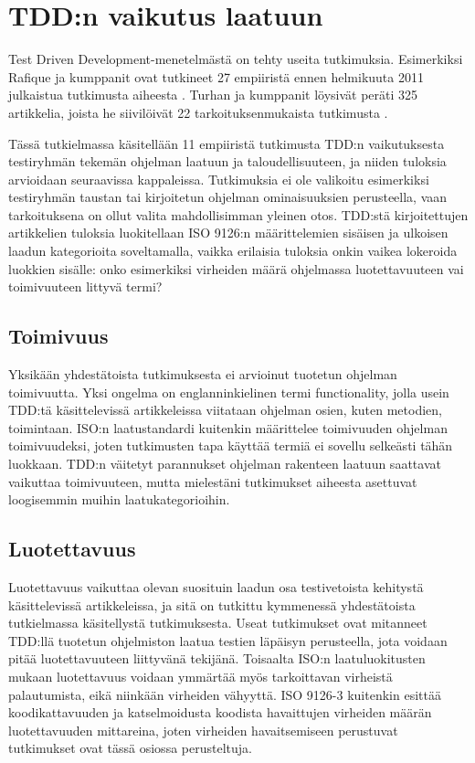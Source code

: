 \documentclass[finnish]{tktltiki2}
\theoremstyle{definition}
\theoremstyle{remark}
\begin{document}
\section{TDD:n vaikutus laatuun}

Test Driven Development-menetelmästä on tehty useita tutkimuksia. Esimerkiksi Rafique ja kumppanit ovat tutkineet 27 empiiristä ennen helmikuuta 2011 julkaistua tutkimusta aiheesta \cite{Rafique13}. Turhan ja kumppanit löysivät peräti 325 artikkelia, joista he siivilöivät 22 tarkoituksenmukaista tutkimusta \cite{Turhan10}.

Tässä tutkielmassa käsitellään 11 empiiristä tutkimusta TDD:n vaikutuksesta testiryhmän tekemän ohjelman laatuun ja taloudellisuuteen, ja niiden tuloksia arvioidaan seuraavissa kappaleissa. Tutkimuksia ei ole valikoitu esimerkiksi testiryhmän taustan tai kirjoitetun ohjelman ominaisuuksien perusteella, vaan tarkoituksena on ollut valita mahdollisimman yleinen otos. TDD:stä kirjoitettujen artikkelien tuloksia luokitellaan ISO 9126:n määrittelemien sisäisen ja ulkoisen laadun kategorioita soveltamalla, vaikka erilaisia tuloksia onkin vaikea lokeroida luokkien sisälle: onko esimerkiksi virheiden määrä ohjelmassa luotettavuuteen vai toimivuuteen littyvä termi? 





\subsection{Toimivuus}

Yksikään yhdestätoista tutkimuksesta ei arvioinut tuotetun ohjelman toimivuutta. Yksi ongelma on englanninkielinen termi functionality, jolla usein TDD:tä käsittelevissä artikkeleissa viitataan ohjelman osien, kuten metodien, toimintaan. ISO:n laatustandardi kuitenkin määrittelee toimivuuden ohjelman toimivuudeksi, joten tutkimusten tapa käyttää termiä ei sovellu selkeästi tähän luokkaan. TDD:n väitetyt parannukset ohjelman rakenteen laatuun saattavat vaikuttaa toimivuuteen, mutta mielestäni tutkimukset aiheesta asettuvat loogisemmin muihin laatukategorioihin.

\subsection{Luotettavuus}

Luotettavuus vaikuttaa olevan suosituin laadun osa testivetoista kehitystä käsittelevissä artikkeleissa, ja sitä on tutkittu kymmenessä yhdestätoista tutkielmassa käsitellystä tutkimuksesta. Useat tutkimukset ovat mitanneet TDD:llä tuotetun ohjelmiston laatua testien läpäisyn perusteella, jota voidaan pitää luotettavuuteen liittyvänä tekijänä. Toisaalta ISO:n laatuluokitusten mukaan luotettavuus voidaan ymmärtää myös tarkoittavan virheistä palautumista, eikä niinkään virheiden vähyyttä. ISO 9126-3 kuitenkin esittää koodikattavuuden ja katselmoidusta koodista havaittujen virheiden määrän luotettavuuden mittareina, joten virheiden havaitsemiseen perustuvat tutkimukset ovat tässä osiossa perusteltuja.
\end{document}
